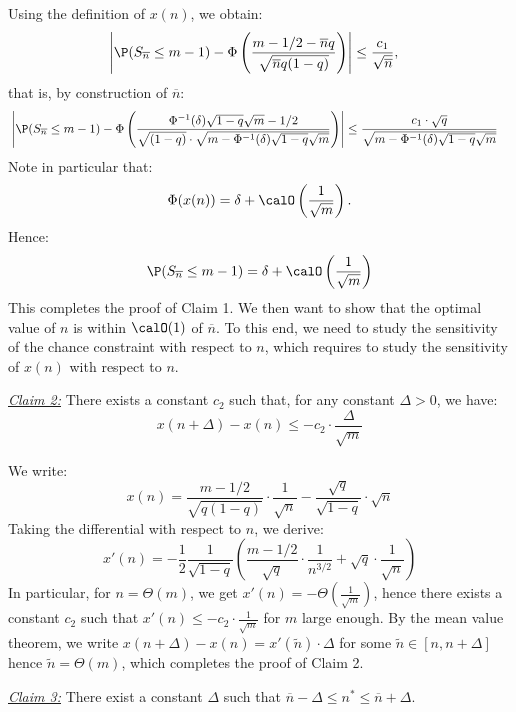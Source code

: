 \documentclass[blindrev]{informs3noheader}
\begin{document}
Using the definition of $x(n)$, we obtain:
\begin{align*}
& \left|\P(S_{\overline n}\leq m-1)-\Phi\left(\frac{m-1/2-{\overline n}q}{\sqrt{{\overline n}q(1-q)}}\right)\right|\leq\frac{c_1}{\sqrt {\overline n}},
\end{align*}
that is, by construction of $\overline n$:
\begin{align*}
&\left|\P(S_{\overline n}\leq m-1)-\Phi\left(\frac{\Phi^{-1}(\delta)\sqrt{1-q}\sqrt{m}-1/2}{\sqrt{(1-q)}\cdot\sqrt{m-\Phi^{-1}(\delta)\sqrt{1-q}\sqrt{m}}}\right)\right|\leq\frac{c_1\cdot\sqrt{q}}{\sqrt{m-\Phi^{-1}(\delta)\sqrt{1-q}\sqrt{m}}}
\end{align*}
Note in particular that:
$$\Phi(x(n))=\delta+\calO\left(\frac{1}{\sqrt{m}}\right).$$
Hence:
$$\P(S_{\overline n}\leq m-1)=\delta+\calO\left(\frac{1}{\sqrt{m}}\right)$$
This completes the proof of Claim 1. We then want to show that the optimal value of $n$ is within $\calO(1)$ of $\overline{n}$. To this end, we need to study the sensitivity of the chance constraint with respect to $n$, which requires to study the sensitivity of $x(n)$ with respect to $n$.

\underline{\textit{Claim 2:}} There exists a constant $c_2$ such that, for any constant $\Delta>0$, we have:
$$x(n+\Delta)-x(n)\leq-c_2\cdot\frac{\Delta}{\sqrt{m}}$$

We write:
$$x(n)=\frac{m-1/2}{\sqrt{q(1-q)}}\cdot\frac{1}{\sqrt n}-\frac{\sqrt q}{\sqrt{1-q}}\cdot\sqrt n$$
Taking the differential with respect to $n$, we derive:
$$x'(n)=-\frac{1}{2}\frac{1}{\sqrt{1-q}}\left(\frac{m-1/2}{\sqrt q}\cdot\frac{1}{n^{3/2}}+\sqrt q\cdot\frac{1}{\sqrt n}\right)$$
In particular, for $n=\Theta(m)$, we get $x'(n)=-\Theta\left(\frac{1}{\sqrt{m}}\right)$, hence there exists a constant $c_2$ such that $x'(n)\leq-c_2\cdot\frac{1}{\sqrt{m}}$ for $m$ large enough. By the mean value theorem, we write $x(n+\Delta)-x(n)=x'(\widetilde{n})\cdot\Delta$ for some $\widetilde{n}\in[n,n+\Delta]$ hence $\widetilde n=\Theta(m)$, which completes the proof of Claim 2.

\underline{\textit{Claim 3:}} There exist a constant $\Delta$ such that $\overline{n}-\Delta\leq n^*\leq\overline{n}+\Delta$.
\end{document}
